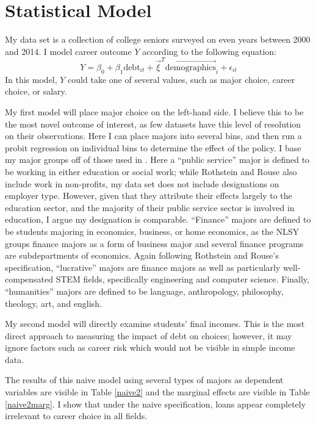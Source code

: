 \documentclass[12pt]{article}
\begin{document}
	\section{Statistical Model}
	
	My data set is a collection of college seniors surveyed on even years between 2000 and 2014. I model career outcome $Y$ according to the following equation: 
	\begin{equation}
	Y = \beta_0 + \beta_1 \mbox{debt}_{it} + \vec{\xi}^T \vec{\mbox{demographics}}_i + \epsilon_{it} \label{naiveeq}
	\end{equation} 
	In this model, $Y$ could take one of several values, such as major choice, career choice, or salary. 
	
	My first model will place major choice on the left-hand side. I believe this to be the most novel outcome of interest, as few datasets have this level of resolution on their observations. Here I can place majors into several bins, and then run a probit regression on individual bins to determine the effect of the policy. I base my major groups off of those used in \textcite{rothstein2011}. Here a ``public service'' major is defined to be working in either education or social work; while Rothstein and Rouse also include work in non-profits, my data set does not include designations on employer type. However, given that they attribute their effects largely to the education sector, and the majority of their public service sector is involved in education, I argue my designation is comparable. ``Finance'' majors are defined to be students majoring in economics, business, or home economics, as the NLSY groups finance majors as a form of business major and several finance programs are subdepartments of economics. Again following Rothstein and Rouse's specification, ``lucrative'' majors are finance majors as well as particularly well-compensated STEM fields, specifically engineering and computer science. Finally, ``humanities'' majors are defined to be language, anthropology, philosophy, theology, art, and english.
	
	My second model will directly examine students' final incomes. This is the most direct approach to measuring the impact of debt on choices; however, it may ignore factors such as career risk which would not be visible in simple income data.
	
	The results of this naive model using several types of majors as dependent variables are visible in Table \ref{naive2} and the marginal effects are visible in Table \ref{naive2marg}. I show that under the naive specification, loans appear completely irrelevant to career choice in all fields.
	
\end{document}
